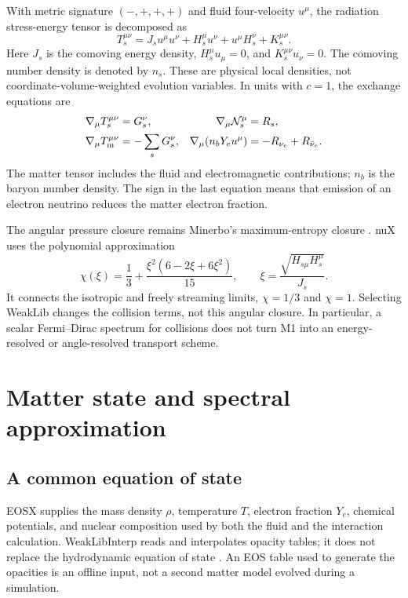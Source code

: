 \documentclass[aps,prd,reprint,nofootinbib,notitlepage]{revtex4-2}
\newcommand{\nue}{\nu_e}
\newcommand{\anue}{\bar{\nu}_e}
\begin{document}
With metric signature $(-,+,+,+)$ and fluid four-velocity $u^\mu$, the
radiation stress-energy tensor is decomposed as
\begin{equation}
 T_s^{\mu\nu}=J_s u^\mu u^\nu
       +H_s^\mu u^\nu+u^\mu H_s^\nu+K_s^{\mu\nu}.
 \label{eq:stress}
\end{equation}
Here $J_s$ is the comoving energy density, $H_s^\mu u_\mu=0$, and
$K_s^{\mu\nu}u_\nu=0$. The comoving number density is denoted by $n_s$.
These are physical local densities, not coordinate-volume-weighted
evolution variables. In units with $c=1$, the exchange equations are
\begin{align}
 \nabla_\mu T_s^{\mu\nu}&=G_s^\nu, &
 \nabla_\mu {\cal N}_s^\mu&=R_s, \label{eq:radiation_exchange}\\
 \nabla_\mu T_{\mathrm{m}}^{\mu\nu}&=-\sum_s G_s^\nu, &
 \nabla_\mu(n_bY_eu^\mu)&=-R_{\nue}+R_{\anue}.
 \label{eq:matter_exchange}
\end{align}
The matter tensor includes the fluid and electromagnetic contributions;
$n_b$ is the baryon number density. The sign in the last equation means
that emission of an electron neutrino reduces the matter electron fraction.

The angular pressure closure remains Minerbo's maximum-entropy closure
\cite{Minerbo1978}. nuX uses the polynomial approximation
\begin{equation}
 \chi(\xi)=\frac13+
       \frac{\xi^2(6-2\xi+6\xi^2)}{15},\qquad
 \xi=\frac{\sqrt{H_{s\mu}H_s^\mu}}{J_s}.
 \label{eq:minerbo}
\end{equation}
It connects the isotropic and freely streaming limits, $\chi=1/3$ and
$\chi=1$. Selecting WeakLib changes the collision terms, not this angular
closure. In particular, a scalar Fermi--Dirac spectrum for collisions does
not turn M1 into an energy-resolved or angle-resolved transport scheme.

\section{Matter state and spectral approximation}

\subsection{A common equation of state}

EOSX supplies the mass density $\rho$, temperature $T$, electron fraction
$Y_e$, chemical potentials, and nuclear composition used by both the fluid
and the interaction calculation. WeakLibInterp reads and interpolates
opacity tables; it does not replace the hydrodynamic equation of state
\cite{WeakLib,WeakLibInterp}. An EOS table used to generate the opacities
is an offline input, not a second matter model evolved during a simulation.
\end{document}
